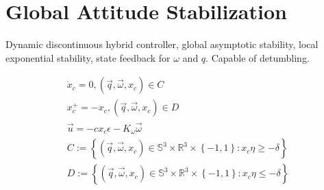 \section{Global Attitude Stabilization}

Dynamic discontinuous hybrid controller, global asymptotic stability, local exponential stability, state feedback for $\omega$ and $q$. Capable of detumbling. \cite{globalAttController}

\[
\begin{array}{l}

\dot{x}_c = 0, (\vec{q},\vec{\omega},x_c) \in C\ \\ 
x_c^+ = -x_c, (\vec{q},\vec{\omega},x_c) \in D\ \\ 
\vec{u} = -c x_c \epsilon -K_\omega \vec{\omega} \\
C:= \left\lbrace (\vec{q},\vec{\omega},x_c) \in \mathbb{S}^3 \times \mathbb{R}^3 \times \left\lbrace -1,1 \right\rbrace : x_c\eta \geq -\delta \right\rbrace  \\

D:= \left\lbrace (\vec{q},\vec{\omega},x_c) \in \mathbb{S}^3 \times \mathbb{R}^3 \times \left\lbrace -1,1 \right\rbrace : x_c\eta \leq -\delta \right\rbrace 
\end{array}
\]
